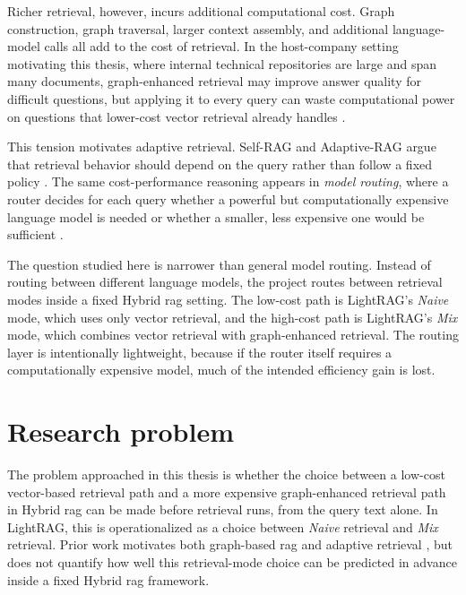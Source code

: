 \documentclass[english, bibtex]{kththesis}               %
\numberwithin{listing}{chapter}
\begin{document}
Richer retrieval, however, incurs additional computational cost. Graph construction, graph traversal, larger context assembly, and additional language-model calls all add to the cost of retrieval. In the host-company setting motivating this thesis, where internal technical repositories are large and span many documents, graph-enhanced retrieval may improve answer quality for difficult questions, but applying it to every query can waste computational power on questions that lower-cost vector retrieval already handles \cite{jeong2024adaptiverag,hu2024routerbench}.

This tension motivates adaptive retrieval. Self-RAG and Adaptive-RAG argue that retrieval behavior should depend on the query rather than follow a fixed policy \cite{asai2023selfrag,jeong2024adaptiverag}. The same cost-performance reasoning appears in \emph{model routing}, where a router decides for each query whether a powerful but computationally expensive language model is needed or whether a smaller, less expensive one would be sufficient \cite{hu2024routerbench}.

The question studied here is narrower than general model routing. Instead of routing between different language models, the project routes between retrieval modes inside a fixed Hybrid \gls{rag} setting. The low-cost path is LightRAG's \emph{Naive} mode, which uses only vector retrieval, and the high-cost path is LightRAG's \emph{Mix} mode, which combines vector retrieval with graph-enhanced retrieval. The routing layer is intentionally lightweight, because if the router itself requires a computationally expensive model, much of the intended efficiency gain is lost.

\section{Research problem}
\label{sec:problem}

The problem approached in this thesis is whether the choice between a low-cost vector-based retrieval path and a more expensive graph-enhanced retrieval path in Hybrid \gls{rag} can be made before retrieval runs, from the query text alone. In LightRAG, this is operationalized as a choice between \emph{Naive} retrieval and \emph{Mix} retrieval. Prior work motivates both graph-based \gls{rag} and adaptive retrieval \cite{edge2024graphrag,lightrag2024,asai2023selfrag,jeong2024adaptiverag}, but does not quantify how well this retrieval-mode choice can be predicted in advance inside a fixed Hybrid \gls{rag} framework.
\end{document}
